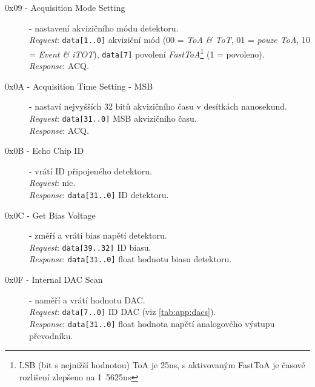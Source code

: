 \begin{description}
    \item[0x09 - Acquisition Mode Setting] - nastavení akvizičního módu detektoru.
    \\\textit{Request}: \texttt{data[1..0]} akviziční mód (00 = \textit{ToA \& ToT}, 01 = \textit{pouze ToA}, 10 = \textit{Event \& iTOT}), \texttt{data[7]} povolení \textit{FastToA}\footnote{LSB (bit s nejnižší hodnotou) ToA je \unit{25}{ns}, s aktivovaným FastToA je časové rozlišení zlepšeno na \unit{1.5625}{ns}} (1 = povoleno).
    \\\textit{Response}: ACQ.

    \item[0x0A - Acquisition Time Setting - MSB] - nastaví nejvyšších 32 bitů akvizičního času v desítkách nanosekund.
    \\\textit{Request}: \texttt{data[31..0]} MSB akvizičního času.
    \\\textit{Response}: ACQ.

    \item[0x0B - Echo Chip ID] - vrátí ID připojeného detektoru.
    \\\textit{Request}: nic.
    \\\textit{Response}: \texttt{data[31..0]} ID detektoru.

    \item[0x0C - Get Bias Voltage] - změří a vrátí bias napětí detektoru.
    \\\textit{Request}: \texttt{data[39..32]} ID biasu.
    \\\textit{Response}: \texttt{data[31..0]} float hodnotu biasu detektoru.


    \item[0x0F - Internal DAC Scan] - naměří a vrátí hodnotu DAC.
    \\\textit{Request}: \texttt{data[7..0]} ID DAC (viz \ref{tab:app:dacs}).
    \\\textit{Response}: \texttt{data[31..0]} float hodnota napětí analogového výstupu převodníku.



\end{description}
